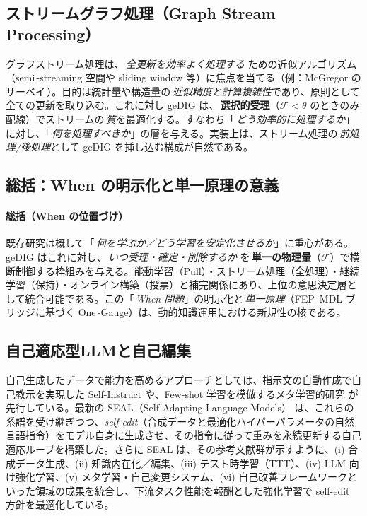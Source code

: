 \documentclass[ja=standard,xelatex]{bxjsarticle}
\newcommand{\F}{\mathcal{F}}
\begin{document}
\subsection{ストリームグラフ処理（Graph Stream Processing）}
\label{sec:related_stream}
グラフストリーム処理は、\,\emph{全更新を効率よく処理する} ための近似アルゴリズム（semi\,\mbox{-}streaming 空間や sliding window 等）に焦点を当てる（例：McGregor のサーベイ\,\cite{McGregor2014GraphStreams}）。目的は統計量や構造量の\,\emph{近似精度と計算複雑性}であり、原則として全ての更新を取り込む。これに対し geDIG は、\,\textbf{選択的受理}（$\F{<}\theta$ のときのみ配線）でストリームの\,\emph{質}を最適化する。すなわち「\,\emph{どう効率的に処理するか}」に対し、「\,\emph{何を処理すべきか}」の層を与える。実装上は、ストリーム処理の\,\emph{前処理/後処理}として geDIG を挿し込む構成が自然である。

\subsection{総括：When の明示化と単一原理の意義}
\paragraph{総括（When の位置づけ）}
既存研究は概して「\,\emph{何を学ぶか／どう学習を安定化させるか}」に重心がある。geDIG はこれに対し、\,\emph{いつ受理・確定・削除するか} を\,\textbf{単一の物理量}（$\F$）で横断制御する枠組みを与える。能動学習（Pull）・ストリーム処理（全処理）・継続学習（保持）・オンライン構築（投票）と補完関係にあり、上位の意思決定層として統合可能である。この「\,\emph{When 問題}」の明示化と\,\emph{単一原理}（FEP–MDL ブリッジに基づく One\,\mbox{-}Gauge）は、動的知識運用における新規性の核である。

\subsection{自己適応型LLMと自己編集}

自己生成したデータで能力を高めるアプローチとしては、指示文の自動作成で自己教示を実現した Self-Instruct\cite{wang2022selfinstruct} や、Few-shot 学習を模倣するメタ学習的研究\cite{Lampinen2025LatentLearning} が先行している。最新の SEAL（Self-Adapting Language Models）\cite{zweiger2025seal} は、これらの系譜を受け継ぎつつ、\emph{self-edit}（合成データと最適化ハイパーパラメータの自然言語指令）をモデル自身に生成させ、その指令に従って重みを永続更新する自己適応ループを構築した。さらに SEAL は、その参考文献群が示すように、(i) 合成データ生成、(ii) 知識内在化／編集、(iii) テスト時学習（TTT）、(iv) LLM 向け強化学習、(v) メタ学習・自己変更システム、(vi) 自己改善フレームワークといった領域の成果を統合し、下流タスク性能を報酬とした強化学習で self-edit 方針を最適化している。
\end{document}

